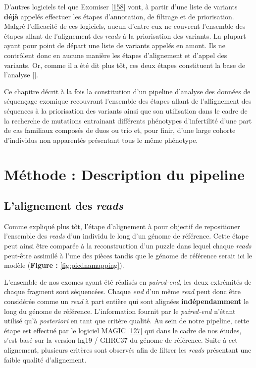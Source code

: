 \documentclass[12pt,twoside]{reedthesis}
\theoremstyle{definition}
\theoremstyle{definition}
\theoremstyle{remark}
\begin{document}
  D'autres logiciels tel que Exomiser
  {[}\protect\hyperlink{ref-Robinson2014}{158}{]} vont, à partir d'une
  liste de variants \textbf{déjà} appelés effectuer les étapes
  d'annotation, de filtrage et de priorisation. Malgré l'efficacité de ces
  logiciels, aucun d'entre eux ne couvrent l'ensemble des étapes allant de
  l'alignement des \emph{reads} à la priorisation des variants. La plupart
  ayant pour point de départ une liste de variants appelés en amont. Ils
  ne contrôlent donc en aucune manière les étapes d'alignement et d'appel
  des variants. Or, comme il a été dit plus tôt, ces deux étapes
  constituent la base de l'analyse {[}{]}.
  
  Ce chapitre décrit à la fois la constitution d'un pipeline d'analyse des
  données de séquençage exomique recouvrant l'ensemble des étapes allant
  de l'allignement des séquences à la priorisation des variants ainsi que
  son utilisation dans le cadre de la recherche de mutations entrainant
  différents phénotypes d'infertilité d'une part de cas familiaux composés
  de duos ou trio et, pour finir, d'une large cohorte d'individus non
  apparentés présentant tous le même phénotype.
  
  \newpage
  
  \section{Méthode : Description du
  pipeline}\label{methode-description-du-pipeline}
  
  \subsection{\texorpdfstring{L'alignement des
  \emph{reads}}{L'alignement des reads}}\label{lalignement-des-reads}
  
  Comme expliqué plus tôt, l'étape d'alignement à pour objectif de
  repositioner l'ensemble des \emph{reads} d'un individu le long d'un
  génome de référence. Cette étape peut ainsi être comparée à la
  reconstruction d'un puzzle dans lequel chaque \emph{reads} peut-être
  assimilé à l'une des pièces tandis que le génome de référence serait ici
  le modèle (\textbf{Figure : }\ref{fig:picdnamapping}).
  
  L'ensemble de nos exomes ayant été réalisés en \emph{paired-end}, les
  deux extrémités de chaque fragment sont séquencées. Chaque \emph{end}
  d'un même \emph{read} peut donc être considérée comme un \emph{read} à
  part entière qui sont alignées \textbf{indépendamment} le long du génome
  de référence. L'information fournit par le \emph{paired-end} n'étant
  utilisé qu'à \emph{posteriori} en tant que critère qualité. Au sein de
  notre pipeline, cette étape est effectué par le logiciel MAGIC
  {[}\protect\hyperlink{ref-Su2014}{127}{]} qui dans le cadre de nos
  études, s'est basé sur la version hg19 / GHRC37 du génome de référence.
  Suite à cet alignement, plusieurs critères sont observés afin de filtrer
  les \emph{reads} présentant une faible qualité d'alignement.
  
\end{document}
